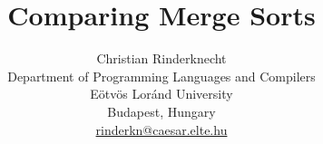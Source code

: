 \documentclass[11pt,a4paper]{article}
\title{Comparing Merge Sorts}
\author{Christian Rinderknecht\\
\small Department of Programming Languages and Compilers\\
\small E\"otv\"os Lor\'and University\\
\small Budapest, Hungary\\
\small \url{rinderkn@caesar.elte.hu}}
\date{}
\begin{document}
\maketitle

\allowdisplaybreaks










\end{document}
